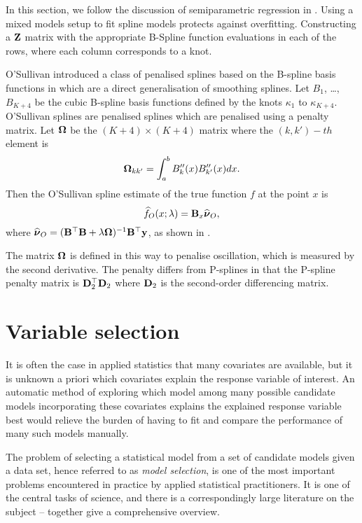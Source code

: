 In this section, we follow the discussion of semiparametric regression in
\cite{ruppert_wand_carroll_2003}.  Using a mixed models setup to fit spline
models protects against overfitting. Constructing a ${\bf Z}$ matrix with the
appropriate B-Spline function evaluations in each of the rows, where each column
corresponds to a knot.

O'Sullivan introduced a class of penalised splines based on the B-spline basis
functions in \cite{OSullivan1986} which are a direct generalisation of smoothing
splines. Let $B_1$, \ldots, $B_{K+4}$ be the cubic B-spline basis functions
defined by the knots $\kappa_1$ to $\kappa_{K+4}$. O'Sullivan splines are
penalised splines which are penalised using a penalty matrix. Let ${\boldsymbol \Omega}$ be
the $(K+4) \times (K+4)$ matrix where the $(k, k')-th$ element is \[
{\boldsymbol \Omega}_{k k'} = \int_a^b B''_k(x) B''_{k'}(x) dx. \] Then the O'Sullivan spline
estimate of the true function $f$ at the point $x$ is \begin{equation*}
\widehat{f}_O(x; \lambda) = {\bf B}_x \widehat{{\boldsymbol \nu}}_O, \end{equation*} where
$\widehat{{\boldsymbol \nu}}_O = ({\bf B}^\top {\bf B} + \lambda {\boldsymbol\Omega})^{-1} {\bf B}^\top {\bf y}$, as
shown in \cite{ruppert_wand_carroll_2003}.

The matrix ${\boldsymbol \Omega}$ is defined in this way to penalise oscillation, which is
measured by the second derivative. The penalty differs from P-splines in that
the P-spline penalty matrix is ${\bf D}_2^\top {\bf D}_2$ where ${\bf D}_2$ is the
second-order differencing matrix.

\section{Variable selection}

It is often the case in applied statistics that many covariates are available,
but it is unknown a priori which covariates explain the response variable of
interest. An automatic method of exploring which model among many possible
candidate models incorporating these covariates explains the explained response
variable best would relieve the burden of having to fit and compare the
performance of many such models manually.

The problem of selecting a statistical model from a set of candidate models
given a data set, hence referred to as \emph{model selection}, is one of the
most important problems encountered in practice by applied statistical
practitioners. It is one of the central tasks of science, and there is a
correspondingly large literature on the subject -- \cite{Claeskens:1251912,
NengjunYi2013, Johnstone2009} together give a comprehensive overview.


